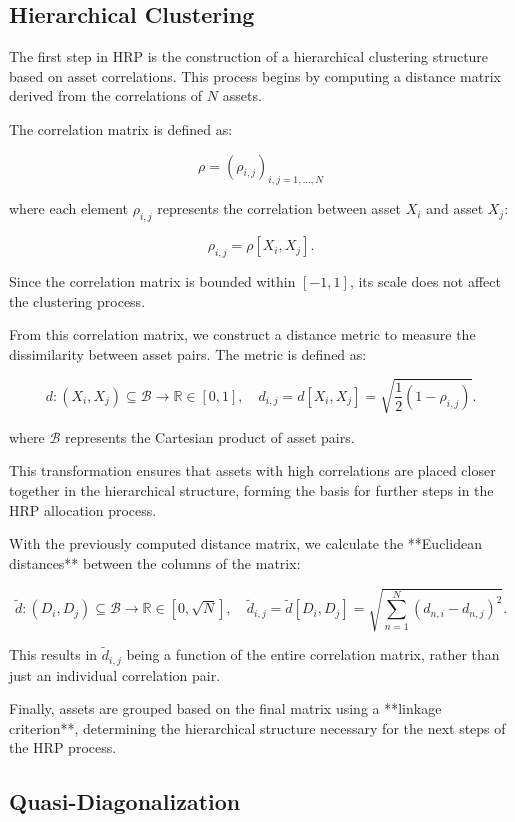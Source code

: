 \documentclass[english]{maciarticle}
\begin{document}
\vspace*{.25cm}


\subsection{Hierarchical Clustering}

The first step in HRP is the construction of a hierarchical clustering structure based on asset correlations. This process begins by computing a distance matrix derived from the correlations of \(N\) assets.

The correlation matrix is defined as:

\[
\rho = \left( \rho_{i,j} \right)_{i,j=1,...,N}
\]

where each element \(\rho_{i,j}\) represents the correlation between asset \(X_i\) and asset \(X_j\):

\[
\rho_{i,j} = \rho[X_i, X_j].
\]

Since the correlation matrix is bounded within \([-1,1]\), its scale does not affect the clustering process.

From this correlation matrix, we construct a distance metric to measure the dissimilarity between asset pairs. The metric is defined as:

\[
d : (X_i, X_j) \subseteq \mathcal{B} \to \mathbb{R} \in [0, 1], \quad d_{i,j} = d[X_i, X_j] = \sqrt{\frac{1}{2}(1 - \rho_{i,j})}.
\]

where \(\mathcal{B}\) represents the Cartesian product of asset pairs.

This transformation ensures that assets with high correlations are placed closer together in the hierarchical structure, forming the basis for further steps in the HRP allocation process.

With the previously computed distance matrix, we calculate the **Euclidean distances** between the columns of the matrix:

\[
\tilde{d} : (D_i, D_j) \subseteq \mathcal{B} \to \mathbb{R} \in [0, \sqrt{N}], \quad \tilde{d}_{i,j} = \tilde{d}[D_i, D_j] = \sqrt{\sum_{n=1}^N (d_{n,i} - d_{n,j})^2}.
\]

This results in \(\tilde{d}_{i,j}\) being a function of the entire correlation matrix, rather than just an individual correlation pair.

Finally, assets are grouped based on the final matrix using a **linkage criterion**, determining the hierarchical structure necessary for the next steps of the HRP process.

\subsection{Quasi-Diagonalization}
\end{document}
